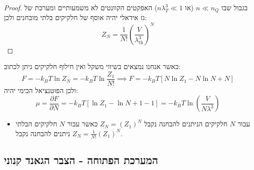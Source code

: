 \documentclass{tstextbook}
\begin{document}
\begin{proof}
בגבול שבו \(n\ll n_{Q}\) (או \(n\lambda_{T}^{3}\ll 1\)) האפקטים הקוונטים לא משמעותיים ומערכת של גז אידאלי יהיה אוסף של חלקיקים בלתי מובחנים ולכן:
$$Z_{N}=\frac{1}{N!}\left(\frac{V}{\lambda_{\mathrm{th}}^{3}}\right)^{N}$$

\end{proof}
\begin{example}
כאשר אנחנו נמצאים בשיווי משקל ואין חילוף חלקיקים ניתן לכתוב:
$$F=-k_{B}T\ln Z_{N}=-k_{B}T\ln \frac{Z_{1}}{N!}\implies F=-k_{B}T\left[ N\ln Z_{1}-N\ln N+N \right]$$
ולכן הפוטנציאל הכימי יהיה:
$$\mu=\frac{\partial F}{\partial N} =-k_{B}T\left[ \ln Z_{1}-\ln N+1 -1 \right]=-k_{B}T\ln \left( \frac{V}{N\lambda^{3}} \right)$$

\end{example}
\begin{summary}
  \begin{itemize}
    \item עבור \(N\) חלקיקים הניתנים להבחנה נקבל \(Z_{N}=(Z_{1})^{N}\) כאשר עבור \(N\) חלקיקים הבלתי ניתנים להבחנה נקבל \(Z_{N}=\frac{1}{N!}(Z_{1})^{N}\).
  \end{itemize}
\end{summary}
\subsection{המערכת הפתוחה - הצבר הגאנד קנוני}
\end{document}
